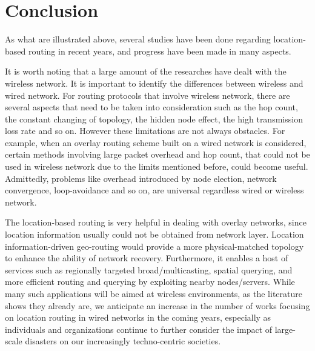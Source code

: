 \documentclass[conference]{IEEEtran}
\begin{document}

\section{Conclusion}
\label{conclusion}
As what are illustrated above, several studies have been done regarding location-based routing in recent years, and progress have been made in many aspects. 

It is worth noting that a large amount of the researches have dealt with the wireless network. It is important to identify the differences between wireless and wired network. For routing protocols that involve wireless network, there are several aspects that need to be taken into consideration
such as the hop count, the constant changing of topology, the hidden node effect, the high transmission loss rate and so on. However these limitations are not always obstacles. For example, when an overlay routing scheme built on a wired network is considered, certain methods involving large packet overhead and hop count, that could not be used in wireless network due to the limits mentioned before, could become useful.  Admittedly, problems like overhead introduced by node election, network convergence, loop-avoidance and so on, are universal regardless wired or wireless network. 

The location-based routing is very helpful in dealing with overlay networks, since location information usually could not be obtained from network layer. Location information-driven geo-routing would provide a more physical-matched topology to enhance the ability of network recovery.
Furthermore, it enables a host of services such as regionally targeted broad/multicasting, spatial querying, and more efficient routing and querying by exploiting nearby nodes/servers.
While many such applications will be aimed at wireless environments, as the literature shows they already are, we anticipate an increase in the number of works focusing on location routing in wired networks in the coming years, especially as individuals and organizations continue to further consider the impact of large-scale disasters on our increasingly techno-centric societies.
\end{document}
